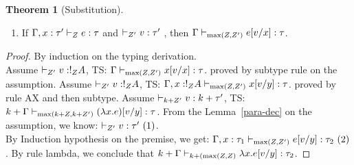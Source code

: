 \documentclass[a4paper,11pt]{article}
\theoremstyle{definition}
\newtheorem{thm}{Theorem}
\begin{document}
\clearpage

\begin{thm}[Substitution]
  \label{sub}
  \begin{enumerate} 
   \item If $ \Gamma,x : \tau' \vdash_{ Z} e : \tau $ and $
  \empty \tvdash{\nnatA'} \valr : \type'  $ , then  $\Gamma
  \vdash_{\max(Z,Z' )} e[v/x]  : \tau$. 
  \end{enumerate}
\end{thm}

\begin{proof}
  By induction on the typing derivation.\\
Assume $\empty \tvdash{\nnatA'} \valr : \bang{\nnatA}\ltype $, TS:  $\Gamma
  \vdash_{\max(Z,Z' )} x[v/x]  : \tau$. proved by
  subtype rule on the assumption.
  Assume $\empty \tvdash{\nnatA'} \valr : \bang{\nnatA}\ltype $, TS:
  $\Gamma,   x: !_{Z}A
  \vdash_{\max(Z,Z' )} x[v/y]  : \tau$. proved by rule
  AX and then subtype.
   Assume $\empty \tvdash{k+\nnatA'} \valr : k+\type' $, TS:
  $k+\Gamma
  \vdash_{\max(k+Z,k+Z' )} (\lambda x. e)[v/y]  : \tau$. From the
  Lemma~\ref{para-dec} on the assumption, we know: $\empty
  \tvdash{\nnatA'} \valr : \type' ~(1)$.\\
  By Induction hypothesis on the premise, we get: $ \Gamma, x:\tau_1
  \vdash_{\max( Z, Z' )}
      e[v/y]: \tau_2 ~(2)$. By rule lambda, we conclude that
      $k+\Gamma \vdash_{ k+ ( \max(Z,Z ) }
      \lambda x.e[v/y]: \tau_2 $.
\end{proof}
\end{document}
